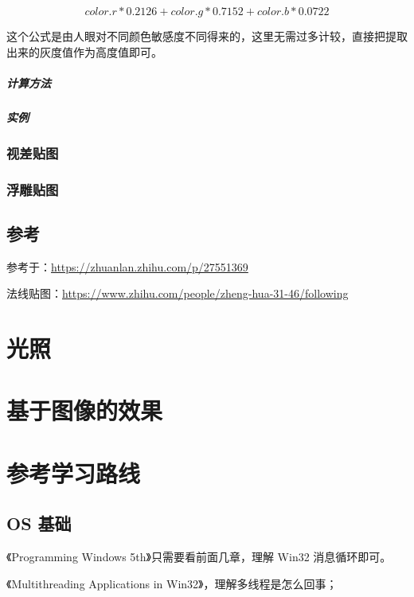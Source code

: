 \documentclass[UTF8,a4paper,12pt]{ctexbook}
\begin{document}
				$$color.r * 0.2126 + color.g * 0.7152 + color.b * 0.0722$$
				
				这个公式是由人眼对不同颜色敏感度不同得来的，这里无需过多计较，直接把提取出来的灰度值作为高度值即可。
			\paragraph{计算方法}
			
			\paragraph{实例}
			
		\subsection{视差贴图}
		
		\subsection{浮雕贴图}
	
	\section{参考}
		参考于：\url{https://zhuanlan.zhihu.com/p/27551369}
		
		法线贴图：\url{https://www.zhihu.com/people/zheng-hua-31-46/following}
		
		
\chapter{光照}


\chapter{基于图像的效果}



\chapter{参考学习路线}					
	
	\section{OS 基础}
		《Programming Windows 5th》只需要看前面几章，理解 Win32 消息循环即可。
	
		《Multithreading Applications in Win32》，理解多线程是怎么回事；
	
\end{document}
